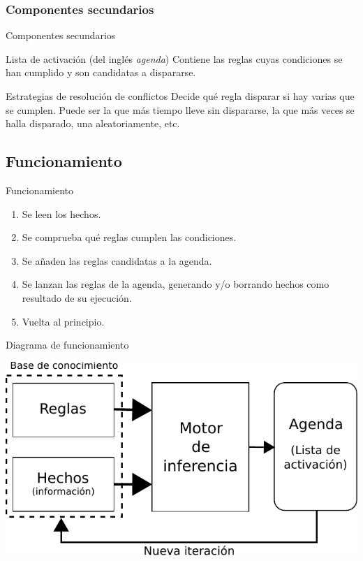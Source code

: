 \documentclass[smaller,spanish,xcolor=svgnames]{beamer}
\begin{document}
\subsubsection{Componentes secundarios}

\begin{frame}{Componentes secundarios}
    \begin{block}{Lista de activación (del inglés \textit{agenda})}
      Contiene las reglas cuyas condiciones se han cumplido y son candidatas a
      dispararse.
    \end{block}

    \begin{block}{Estrategias de resolución de conflictos}
      Decide qué regla disparar si hay varias que se cumplen. Puede ser la que más tiempo lleve sin dispararse, la que más veces se halla disparado, una aleatoriamente, etc.
    \end{block}  
\end{frame}

\subsection{Funcionamiento}
\begin{frame}{Funcionamiento}
  \begin{enumerate}
  \item Se leen los hechos.
  \item Se comprueba qué reglas cumplen las condiciones.
  \item Se añaden las reglas candidatas a la agenda.
  \item Se lanzan las reglas de la agenda, generando y/o borrando hechos como resultado de su ejecución.
  \item Vuelta al principio.
  \end{enumerate}
\end{frame}

\begin{frame}{Diagrama de funcionamiento}
  \begin{center}
    \includegraphics[width=\textwidth]{img/diagrama_funcionamiento}
  \end{center}  
\end{frame}
\end{document}
